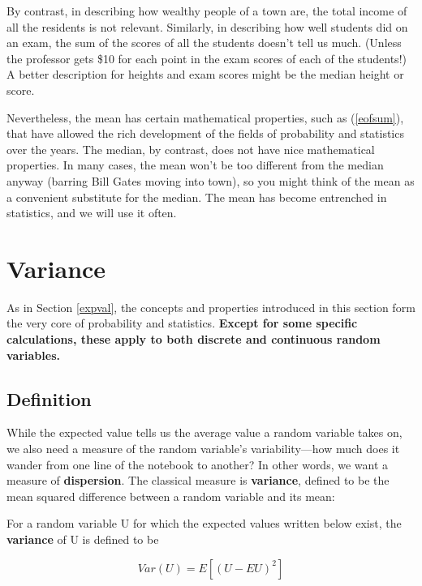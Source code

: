 By contrast, in describing how wealthy people of a town are, the total
income of all the residents is not relevant.  Similarly, in describing
how well students did on an exam, the sum of the scores of all the
students doesn't tell us much.  (Unless the professor gets \$10 for each
point in the exam scores of each of the students!) A better description
for heights and exam scores might be the median height or score.

Nevertheless, the mean has certain mathematical properties, such as
(\ref{eofsum}), that have allowed the rich development of the fields of
probability and statistics over the years.  The median, by contrast,
does not have nice mathematical properties.  In many cases, the mean
won't be too different from the median anyway (barring Bill Gates moving
into town), so you might think of the mean as a convenient substitute
for the median.  The mean has become entrenched in statistics, and we
will use it often.

\section{Variance}
\label{variance}

As in Section \ref{expval}, the concepts and properties introduced in
this section form the very core of probability and statistics.  {\bf
Except for some specific calculations, these apply to both discrete and
continuous random variables.}

\subsection{Definition}

While the expected value tells us the average value a random variable
takes on, we also need a measure of the random variable's
variability---how much does it wander from one line of the notebook to
another?  In other words, we want a measure of {\bf dispersion}.  The
classical measure is {\bf variance}, defined to be the mean squared
difference between a random variable and its mean:

\begin{definition}  For a random variable U for which the expected
values written below exist, the {\bf variance} of U is defined to be

\begin{equation}
\label{vardef}
Var(U) = E[(U-EU)^2]
\end{equation}

\end{definition}

